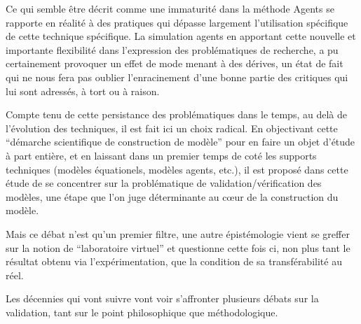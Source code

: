 
Ce qui semble être décrit comme une immaturité dans la méthode Agents \autocite{Heath2009} se rapporte en réalité à des pratiques qui dépasse largement l'utilisation spécifique de cette technique spécifique. La simulation agents en apportant cette nouvelle et importante flexibilité dans l'expression des problématiques de recherche, a pu certainement provoquer un effet de mode menant à des dérives, un état de fait qui ne nous fera pas oublier l'enracinement d'une bonne partie des critiques qui lui sont adressés, à tort ou à raison.

Compte tenu de cette persistance des problématiques dans le temps, au delà de l'évolution des techniques, il est fait ici un choix radical. En objectivant cette \enquote{démarche scientifique de construction de modèle} pour en faire un objet d'étude à part entière, et en laissant dans un premier temps de coté les supports techniques (modèles équationels, modèles agents, etc.), il est proposé dans cette étude de se concentrer sur la problématique de validation/vérification des modèles, une étape que l'on juge déterminante au cœur de la construction du modèle. 






Mais ce débat n'est qu'un premier filtre, une autre épistémologie vient se greffer sur la notion de \enquote{laboratoire virtuel} et questionne cette fois ci, non plus tant le résultat obtenu via l'expérimentation, que la condition de sa transférabilité au réel.

Les décennies qui vont suivre vont voir s'affronter plusieurs débats sur la validation, tant sur le point philosophique que méthodologique.


